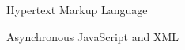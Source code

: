 
   \item[{\bf HTML}]	Hypertext Markup Language
   \item[{\bf AJAX}]	Asynchronous JavaScript and XML
